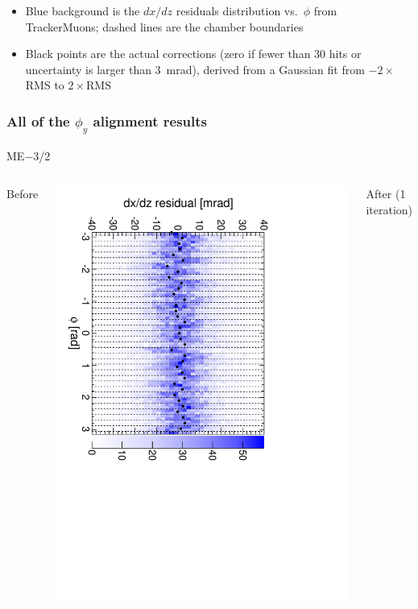 \documentclass[compress]{beamer}
\begin{document}
\begin{frame}
\begin{itemize}
\item Blue background is the $dx/dz$ residuals distribution
  vs.\ $\phi$ from TrackerMuons; dashed lines are the chamber boundaries
\item Black points are the actual corrections (zero if fewer than 30
  hits or uncertainty is larger than 3~mrad), derived from a Gaussian
  fit from $-2\times$RMS to $2\times$RMS
\end{itemize}
\end{frame}

\begin{frame}
\frametitle{All of the $\phi_y$ alignment results}
\begin{center}
ME$-$3/2
\end{center}

\begin{columns}
\centering Before

\includegraphics[height=\linewidth, angle=90]{iter01_mem32.pdf}

\centering After (1 iteration)


\end{columns}
\end{frame}
\end{document}
